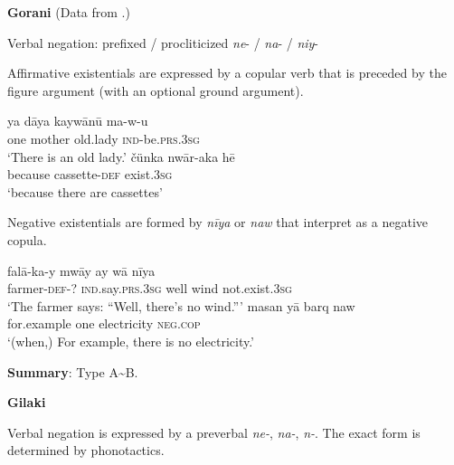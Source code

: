 \documentclass[output=paper]{langsci/langscibook}
\begin{document}
\begin{unindented}
\textbf{Gorani} (Data from \citealt{MahmoudveysiBailey2012}.)

Verbal negation: prefixed / procliticized \textit{ne}- / \textit{na}- /
\textit{niy}- \parencite[25]{MahmoudveysiBailey2012}

Affirmative existentials are expressed by a copular verb that is preceded by the figure argument (with an optional ground argument).
%
\begin{exe}\ex \gll ya   dāya    kaywānū ma-w-u \\
one mother old.lady  \textsc{ind}-be.\textsc{prs.3sg} \\
    \glt `There is an old lady.' \parencite[15]{MahmoudveysiBailey2012}
\ex \gll čünka    nwār-aka       hē \\
because cassette-\textsc{def}  exist.\textsc{3sg} \\
    \glt `because there are cassettes' \parencite[34]{MahmoudveysiBailey2012}
    \end{exe}

Negative existentials are formed by \textit{nīya} or \textit{naw} that
\citeauthor{MahmoudveysiBailey2012} interpret as a negative copula. 
%
\begin{exe}\ex
    \gll falā-ka-y mwāy ay     wā     nīya \\
farmer-\textsc{def}-?   \textsc{ind}.say.\textsc{prs}.\textsc{3sg}  well  wind  not.exist.\textsc{3sg} \\
    \glt `The farmer says: “Well, there's no wind.”'
\parencite[61]{MahmoudveysiBailey2012}
\ex \gll masan yā   barq         naw \\
for.example one electricity \textsc{neg.cop} \\
    \glt `(when,) For example, there is no electricity.'
\parencite[159]{MahmoudveysiBailey2012}
    \end{exe}

\textbf{Summary}: Type A{\textasciitilde}B.

\textbf{Gilaki} \parencite{RastorguevaKerimova2012}

Verbal negation is expressed by a preverbal \textit{ne-}, \textit{na-}, \textit{n-}. The exact form is determined by phonotactics. 


\end{unindented}
\end{document}
